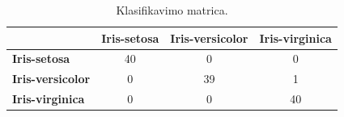 \begin{table}[H]
    \centering
    \caption{Klasifikavimo matrica.}
    \begin{tabular}{|l|c|c|c|}
        \hline
        & \textbf{Iris-setosa} & \textbf{Iris-versicolor} & \textbf{Iris-virginica} \\
        \hline
        \textbf{Iris-setosa} & 40 & 0 & 0 \\ \hline
        \textbf{Iris-versicolor} & 0 & 39 & 1 \\ \hline
        \textbf{Iris-virginica} & 0 & 0 & 40 \\ \hline
    \end{tabular}
    \label{tab:mokymo_klasifikavimo_matrica}
\end{table}